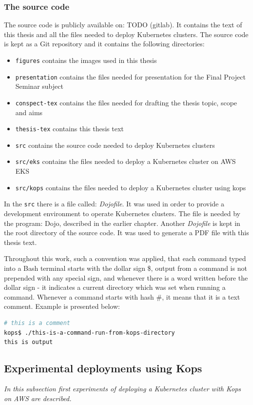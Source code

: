 \subsubsection{The source code}
The source code is publicly available on: TODO (gitlab). It contains the text of this thesis and all the files needed to deploy Kubernetes clusters. The source code is kept as a Git repository and it contains the following directories:
\begin{itemize}
\item \verb|figures| contains the images used in this thesis
\item \verb|presentation| contains the files needed for presentation for the Final Project Seminar subject
\item \verb|conspect-tex| contains the files needed for drafting the thesis topic, scope and aims
\item \verb|thesis-tex| contains this thesis text
\item \verb|src| contains the source code needed to deploy Kubernetes clusters
\item \verb|src/eks| contains the files needed to deploy a Kubernetes cluster on AWS EKS
\item \verb|src/kops| contains the files needed to deploy a Kubernetes cluster using kops
\end{itemize}

In the \verb|src| there is a file called: \textit{Dojofile}. It was used in order to provide a development environment to operate Kubernetes clusters. The file is needed by the program: Dojo, described in the earlier chapter. Another \textit{Dojofile} is kept in the root directory of the source code. It was used to generate a PDF file with this thesis text.

Throughout this work, such a convention was applied, that each command typed into a Bash terminal starts with the dollar sign \$, output from a command is not prepended with any special sign, and whenever there is a word written before the dollar sign - it indicates a current directory which was set when running a command. Whenever a command starts with hash #, it means that it is a text comment. Example is presented below:
\begin{lstlisting}[basicstyle=\tiny,caption={TODO},captionpos=b,language=Bash,xleftmargin=1cm]
# this is a comment
kops$ ./this-is-a-command-run-from-kops-directory
this is output
\end{lstlisting}

\subsection{Experimental deployments using Kops}
\textit{In this subsection first experiments of deploying a Kubernetes cluster with Kops on AWS are described.}
\\

